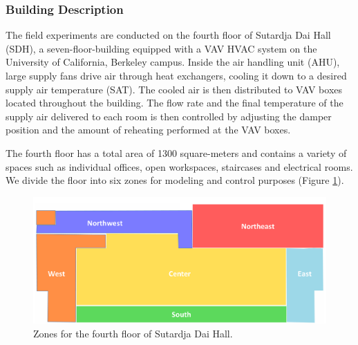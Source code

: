 


\subsubsection{Building Description}\label{sec:building_description}
The field experiments are conducted on the fourth floor of Sutardja Dai Hall (SDH), a seven-floor-building equipped with a VAV HVAC system on the University of California, Berkeley campus. 
Inside the air handling unit (AHU), large supply fans drive air through heat exchangers, cooling it down to a desired supply air temperature (SAT). The cooled air is then distributed to VAV boxes located throughout the building. The flow rate and the final temperature of the supply air delivered to each room is then controlled by adjusting the damper position and the amount of reheating performed at the VAV boxes. 

The fourth floor has a total area of 1300 square-meters and contains a variety of spaces such as individual offices, open workspaces, staircases and electrical rooms. 
We divide the floor into six zones for modeling and control purposes (Figure \ref{fig:floor_plan}).

\begin{figure}[h]
\centering
\vspace*{-0.4cm}
\includegraphics[scale=0.30]{chapters/building_exp/figures/FloorPlan.png}
\vspace*{-0.05cm}
\caption{Zones for the fourth floor of Sutardja Dai Hall.}
\label{fig:floor_plan}
\vspace*{-0.45cm}
\end{figure}


